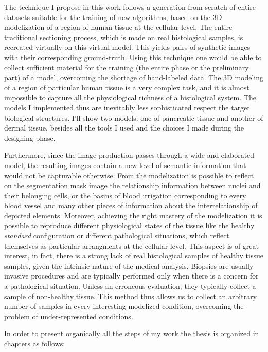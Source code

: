 The technique I propose in this work follows a generation from scratch of entire datasets suitable for the training of new algorithms, based on the 3D modelization of a region of human tissue at the cellular level. The entire traditional sectioning process, which is made on real histological samples, is recreated virtually on this virtual model. This yields pairs of synthetic images with their corresponding ground-truth. Using this technique one would be able to collect sufficient material for the training (the entire phase or the preliminary part) of a model, overcoming the shortage of hand-labeled data. The 3D modeling of a region of particular human tissue is a very complex task, and it is almost impossible to capture all the physiological richness of a histological system. The models I implemented thus are inevitably less sophisticated respect the target biological structures. I'll show two models: one of pancreatic tissue and another of dermal tissue, besides all the tools I used and the choices I made during the designing phase.

Furthermore, since the image production passes through a wide and elaborated model, the resulting images contain a new level of semantic information that would not be capturable otherwise. From the modelization is possible to reflect on the segmentation mask image the relationship information between nuclei and their belonging cells, or the basins of blood irrigation corresponding to every blood vessel and many other pieces of information about the interrelationship of depicted elements. Moreover, achieving the right mastery of the modelization it is possible to reproduce different physiological states of the tissue like the healthy \textit{standard} configuration or different pathological situations, which reflect themselves as particular arrangments at the cellular level. This aspect is of great interest, in fact, there is a strong lack of real histological samples of healthy tissue samples, given the intrinsic nature of the medical analysis. Biopsies are usually invasive procedures and are typically performed only when there is a concern for a pathological situation. Unless an erroneous evaluation, they typically collect a sample of non-healthy tissue. This method thus allows us to collect an arbitrary number of samples in every interesting modelized condition, overcoming the problem of under-represented conditions.

In order to present organically all the steps of my work the thesis is organized in chapters as follows:

